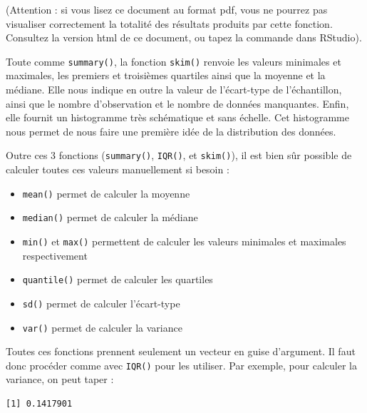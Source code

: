 \documentclass[a4paperpaper,]{article}
\newenvironment{Shaded}{\begin{snugshade}}{\end{snugshade}}
\newcommand{\KeywordTok}[1]{\textcolor[rgb]{0.12,0.11,0.11}{\textbf{#1}}}
\newcommand{\NormalTok}[1]{\textcolor[rgb]{0.12,0.11,0.11}{#1}}
\newcommand{\OperatorTok}[1]{\textcolor[rgb]{0.12,0.11,0.11}{#1}}
\newcommand{\StringTok}[1]{\textcolor[rgb]{0.75,0.01,0.01}{#1}}
\providecommand{\tightlist}{%
  \setlength{\itemsep}{0pt}\setlength{\parskip}{0pt}}
\begin{document}
(Attention : si vous lisez ce document au format pdf, vous ne pourrez pas visualiser correctement la totalité des résultats produits par cette fonction. Consultez la version html de ce document, ou tapez la commande dans RStudio).

Toute comme \texttt{summary()}, la fonction \texttt{skim()} renvoie les valeurs minimales et maximales, les premiers et troisièmes quartiles ainsi que la moyenne et la médiane. Elle nous indique en outre la valeur de l'écart-type de l'échantillon, ainsi que le nombre d'observation et le nombre de données manquantes. Enfin, elle fournit un histogramme très schématique et sans échelle. Cet histogramme nous permet de nous faire une première idée de la distribution des données.

Outre ces 3 fonctions (\texttt{summary()}, \texttt{IQR()}, et \texttt{skim()}), il est bien sûr possible de calculer toutes ces valeurs manuellement si besoin :

\begin{itemize}
\tightlist
\item
  \texttt{mean()} permet de calculer la moyenne
\item
  \texttt{median()} permet de calculer la médiane
\item
  \texttt{min()} et \texttt{max()} permettent de calculer les valeurs minimales et maximales respectivement
\item
  \texttt{quantile()} permet de calculer les quartiles
\item
  \texttt{sd()} permet de calculer l'écart-type
\item
  \texttt{var()} permet de calculer la variance
\end{itemize}

Toutes ces fonctions prennent seulement un vecteur en guise d'argument. Il faut donc procéder comme avec \texttt{IQR()} pour les utiliser. Par exemple, pour calculer la variance, on peut taper :

\begin{Shaded}
\end{Shaded}

\begin{verbatim}
[1] 0.1417901
\end{verbatim}
\end{document}
